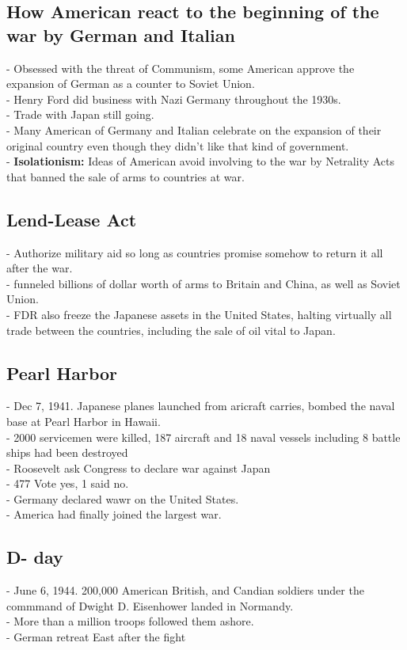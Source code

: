 \documentclass{article}
\begin{document}
\subsection{ How American react to the beginning of the war by German and Italian}
- Obsessed with the threat of Communism, some American approve the expansion of German as a counter to Soviet Union.\\
- Henry Ford did business with Nazi Germany throughout the 1930s. \\
- Trade with Japan still going.\\
- Many American of Germany and Italian celebrate on the expansion of their original country even though they didn't like that kind of government.\\
- \textbf{Isolationism:} Ideas of American avoid involving to the war by Netrality Acts that banned the sale of arms to countries at war.\\

\subsection{ Lend-Lease Act}
- Authorize military aid so long as countries promise somehow to return it all after the war.\\
- funneled billions of dollar worth of arms to Britain and China, as well as Soviet Union.\\
- FDR also freeze the Japanese assets in the United States, halting virtually all trade between the countries, including the sale of oil vital to Japan.\\

\subsection{ Pearl Harbor}
- Dec 7, 1941. Japanese planes launched from aricraft carries, bombed the naval base at Pearl Harbor in Hawaii. \\
- 2000 servicemen were killed, 187 aircraft and 18 naval vessels including 8 battle ships had been destroyed\\
- Roosevelt ask Congress to declare war against Japan\\
- 477 Vote yes, 1 said no.\\
- Germany declared wawr on the United States.\\
- America had finally joined the largest war.\\

\subsection{D- day}
- June 6, 1944. 200,000 American British, and Candian soldiers under the commmand of Dwight D. Eisenhower landed in Normandy.\\
- More than a million troops followed them ashore.\\
- German retreat East after the fight\\
\end{document}

